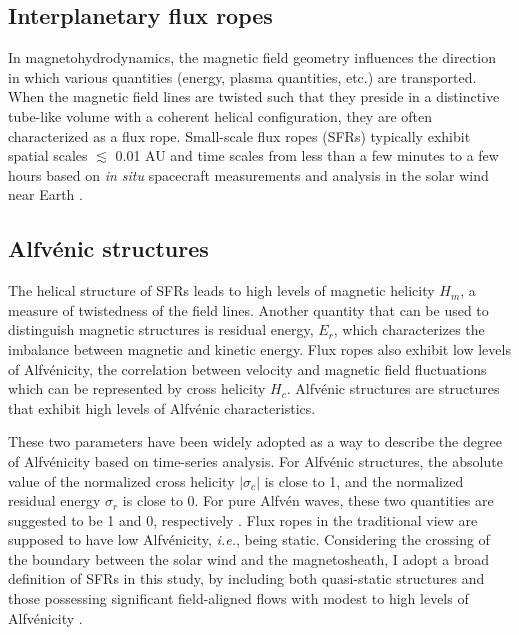 \subsection{Interplanetary flux ropes}
In magnetohydrodynamics, the magnetic field geometry influences the direction in which various quantities (energy, plasma quantities, etc.) are transported. When the magnetic field lines are twisted such that they preside in a distinctive tube-like volume with a coherent helical configuration, they are often characterized as a flux rope. Small-scale flux ropes (SFRs) typically exhibit spatial scales $\lesssim$ 0.01 AU and time scales from less than a few minutes to a few hours based on \textit{in situ} spacecraft measurements and analysis in the solar wind near Earth \citep{Cartwright:2010, Feng:2007, Hu:2018}.

\subsection{Alfv\'enic structures}
The helical structure of SFRs leads to high levels of magnetic helicity $H_m$, a measure of twistedness of the field lines. Another quantity that can be used to distinguish magnetic structures is residual energy, $E_r$, which characterizes the imbalance between magnetic and kinetic energy. Flux ropes also exhibit low levels of Alfv\'enicity, the correlation between velocity and magnetic field fluctuations which can be represented by cross helicity $H_c$. Alfv\'enic structures are structures that exhibit high levels of Alfv\'enic characteristics.


These two parameters have been widely adopted as a way to describe the degree of Alfv\'enicity based on time-series analysis. For Alfv\'enic structures, the absolute value of the normalized cross helicity $|\sigma_c|$ is close to 1, and the normalized residual energy $\sigma_r$ is close to 0. For pure Alfv\'en waves, these two quantities are suggested to be 1 and 0, respectively \citep{Bruno:2013}. Flux ropes in the traditional view are supposed to have low Alfv\'enicity, \textit{i.e.}, being static. Considering the crossing of the boundary between the solar wind and the magnetosheath, I adopt a broad definition of SFRs in this study, by including both quasi-static structures and those possessing significant field-aligned flows with modest to high levels of Alfv\'enicity \citep{Chen:2022}.

